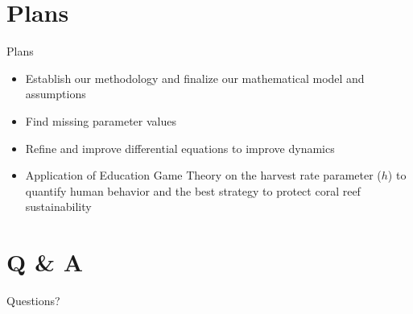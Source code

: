 \documentclass{beamer}
\begin{document}
\section{Plans}
\begin{frame}{Plans}
    \begin{itemize}
        \item Establish our methodology and finalize our mathematical model and assumptions
        \item Find missing parameter values
        \item Refine and improve differential equations to improve dynamics
        \item Application of Education Game Theory on the harvest rate parameter ($h$) to quantify human behavior and the best strategy to protect coral reef sustainability
    \end{itemize}
\end{frame}




\section{Q \& A}
\begin{frame}
    \Huge{Questions?}
\end{frame}
\end{document}

